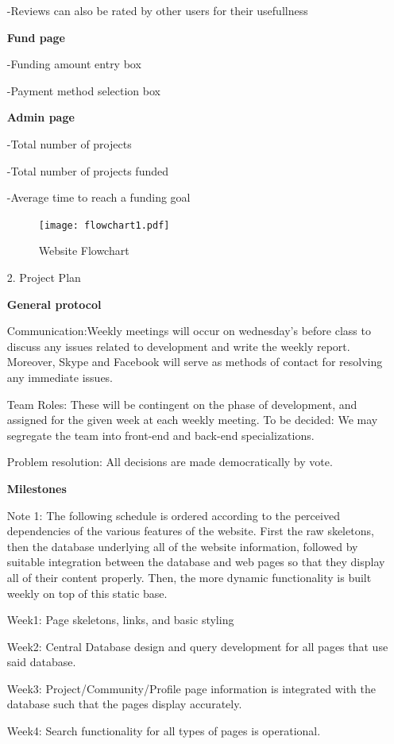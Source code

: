 \documentclass[12pt]{article}
\begin{document}
\begin{enumerate}
-Reviews can also be rated by other users for their usefullness

\textbf{Fund page}

-Funding amount entry box

-Payment method selection box

\textbf{Admin page}

-Total number of projects

-Total number of projects funded

-Average time to reach a funding goal

\begin{figure}[ht!]
\centering
\texttt{[image: flowchart1.pdf]}
\caption{Website Flowchart \label{overflow}}
\end{figure}


\item[2.] Project Plan

\textbf{General protocol}

Communication:Weekly meetings will occur on wednesday's before class to discuss any issues related to development and write the weekly report. Moreover, Skype and Facebook will serve as methods of contact for resolving any immediate issues.

Team Roles: These will be contingent on the phase of development, and assigned for the given week at each weekly meeting. To be decided: We may segregate the team into front-end and back-end specializations.

Problem resolution: All decisions are made democratically by vote.

\textbf{Milestones}

Note 1: The following schedule is ordered according to the perceived dependencies of the various features of the website. First the raw skeletons, then the database underlying all of the website information, followed by suitable integration between the database and web pages so that they display all of their content properly. Then, the more dynamic functionality is built weekly on top of this static base. 

Week1: Page skeletons, links, and basic styling

Week2: Central Database design and query development for all pages that use said database.

Week3: Project/Community/Profile page information is integrated with the database such that the pages display accurately.

Week4: Search functionality for all types of pages is operational.


\end{enumerate}
\end{document}
